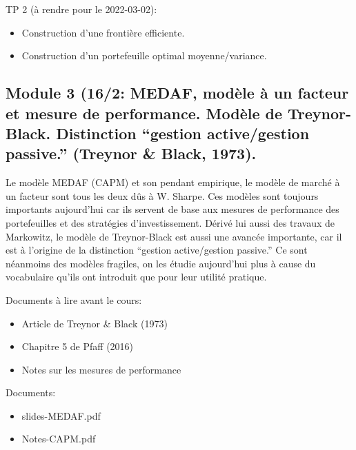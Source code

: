 \documentclass[
  11pt,
]{article}
\providecommand{\tightlist}{%
  \setlength{\itemsep}{0pt}\setlength{\parskip}{0pt}}
\begin{document}
TP 2 (à rendre pour le 2022-03-02):

\begin{itemize}
\tightlist
\item
  Construction d'une frontière efficiente.
\item
  Construction d'un portefeuille optimal moyenne/variance.
\end{itemize}

\hypertarget{module-3-162-medaf-moduxe8le-uxe0-un-facteur-et-mesure-de-performance.-moduxe8le-de-treynor-black.-distinction-gestion-activegestion-passive.-treynor1973.}{%
\subsection{Module 3 (16/2: MEDAF, modèle à un facteur et mesure de
performance. Modèle de Treynor-Black. Distinction ``gestion
active/gestion passive.'' (Treynor \& Black,
1973).}\label{module-3-162-medaf-moduxe8le-uxe0-un-facteur-et-mesure-de-performance.-moduxe8le-de-treynor-black.-distinction-gestion-activegestion-passive.-treynor1973.}}

Le modèle MEDAF (CAPM) et son pendant empirique, le modèle de marché à
un facteur sont tous les deux dûs à W. Sharpe. Ces modèles sont toujours
importants aujourd'hui car ils servent de base aux mesures de
performance des portefeuilles et des stratégies d'investissement. Dérivé
lui aussi des travaux de Markowitz, le modèle de Treynor-Black est aussi
une avancée importante, car il est à l'origine de la distinction
``gestion active/gestion passive.'' Ce sont néanmoins des modèles
fragiles, on les étudie aujourd'hui plus à cause du vocabulaire qu'ils
ont introduit que pour leur utilité pratique.

Documents à lire avant le cours:

\begin{itemize}
\tightlist
\item
  Article de Treynor \& Black (1973)
\item
  Chapitre 5 de Pfaff (2016)
\item
  Notes sur les mesures de performance
\end{itemize}

Documents:

\begin{itemize}
\tightlist
\item
  slides-MEDAF.pdf
\item
  Notes-CAPM.pdf
\end{itemize}
\end{document}
